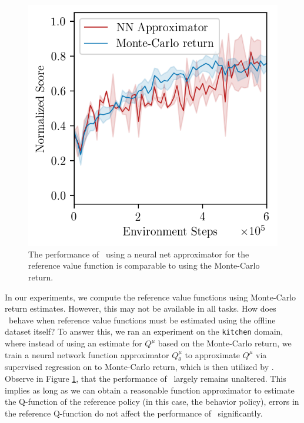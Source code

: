 \begin{figure}
\vspace{-0.9cm}
\begin{center}
\includegraphics[width=0.9\linewidth]{chapters/cal_ql/figs-sample/kitchen-analysis.png}
\vspace{-0.2cm}
\caption{\footnotesize{The performance of \methodname\ using a neural net approximator for the reference value function is comparable to using the Monte-Carlo return.}}
\label{fig:kitchen-regress}
\vspace{-0.8cm}
\end{center}
\end{figure}

In our experiments, we compute the reference value functions using Monte-Carlo return estimates. However, this may not be available in all tasks. How does \methodname\ behave when reference value functions must be estimated using the offline dataset itself? To answer this, we ran an experiment on the \texttt{kitchen} domain, where instead of using an estimate for $Q^\mu$ based on the Monte-Carlo return, we train a neural network function approximator $Q^\mu_\theta$ to approximate $Q^\mu$ via supervised regression on to Monte-Carlo return, which is then utilized by \methodname. 
Observe in Figure \ref{fig:kitchen-regress}, that the performance of \methodname\ largely remains unaltered. This implies as long as we can obtain a reasonable function approximator to estimate the Q-function of the reference policy (in this case, the behavior policy), errors in the reference Q-function do not affect the performance of \methodname\ significantly.

